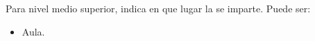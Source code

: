 \begin{bGlosario}
	 Para nivel medio superior, indica en que lugar la  se imparte. Puede ser:
		\begin{itemize}
			\item Aula.

\end{itemize}
\end{bGlosario}
